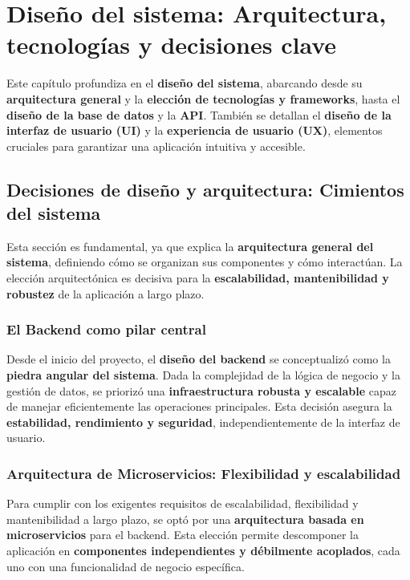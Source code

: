 \chapter{Diseño del sistema: Arquitectura, tecnologías y decisiones clave}\label{cap:disenio}


Este capítulo profundiza en el \textbf{diseño del sistema}, abarcando desde su \textbf{arquitectura general} y la \textbf{elección de tecnologías y frameworks}, hasta el \textbf{diseño de la base de datos} y la \textbf{API}. También se detallan el \textbf{diseño de la interfaz de usuario (UI)} y la \textbf{experiencia de usuario (UX)}, elementos cruciales para garantizar una aplicación intuitiva y accesible.

\section{Decisiones de diseño y arquitectura: Cimientos del sistema}

Esta sección es fundamental, ya que explica la \textbf{arquitectura general del sistema}, definiendo cómo se organizan sus componentes y cómo interactúan. La elección arquitectónica es decisiva para la \textbf{escalabilidad, mantenibilidad y robustez} de la aplicación a largo plazo.

\subsection{El Backend como pilar central}

Desde el inicio del proyecto, el \textbf{diseño del backend} se conceptualizó como la \textbf{piedra angular del sistema}. Dada la complejidad de la lógica de negocio y la gestión de datos, se priorizó una \textbf{infraestructura robusta y escalable} capaz de manejar eficientemente las operaciones principales. Esta decisión asegura la \textbf{estabilidad, rendimiento y seguridad}, independientemente de la interfaz de usuario.

\subsection{Arquitectura de Microservicios: Flexibilidad y escalabilidad}

Para cumplir con los exigentes requisitos de escalabilidad, flexibilidad y mantenibilidad a largo plazo, se optó por una \textbf{arquitectura basada en microservicios} para el backend. Esta elección permite descomponer la aplicación en \textbf{componentes independientes y débilmente acoplados}, cada uno con una funcionalidad de negocio específica.


